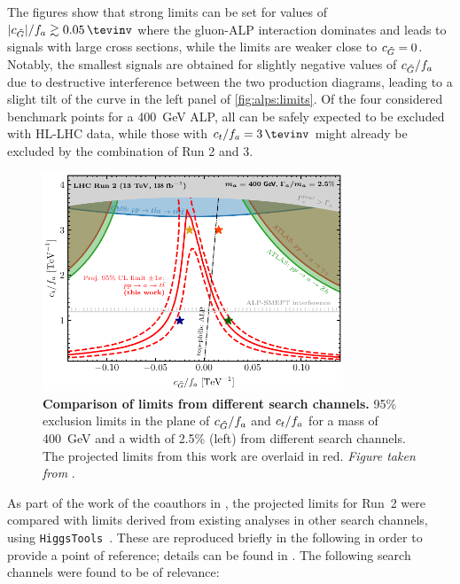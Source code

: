 The figures show that strong limits can be set for values of $|\cG|/f_a 	\gtrsim \SI{0.05}{\tevinv}$ where the gluon-ALP interaction dominates and leads to signals with large cross sections, while the limits are weaker close to $c_{\tilde{G}} = 0$. Notably, the smallest signals are obtained for slightly negative values of $c_{\tilde{G}}/f_a$ due to destructive interference between the two production diagrams, leading to a slight tilt of the curve in the left panel of \cref{fig:alps:limits}. Of the four considered benchmark points for a \SI{400}{\GeV} ALP, all can be safely expected to be excluded with HL-LHC data, while those with $\ct/f_a = \SI{3}{\tevinv}$ might already be excluded by the combination of Run 2 and 3.

\begin{figure}[t]
    \centering
    \includegraphics[width=0.8\textwidth]{figures/alps/sum400.pdf}
    \caption{
        \textbf{Comparison of limits from different search channels.} 95\% exclusion limits in the plane of $c_{\tilde{G}}/f_a$ and $c_t/f_a$ for a mass of \SI{400}{\GeV} and a width of 2.5\% (left) from different search channels. The projected limits from this work are overlaid in red. \textit{Figure taken from }.
    }
    \label{fig:alps:summary}
\end{figure}

As part of the work of the coauthors in , the projected limits for Run~2 were compared with limits derived from existing analyses in other search channels, using \texttt{HiggsTools}~\cite{Bahl:2022igd}. These are reproduced briefly in the following in order to provide a point of reference; details can be found in . The following search channels were found to be of relevance:

